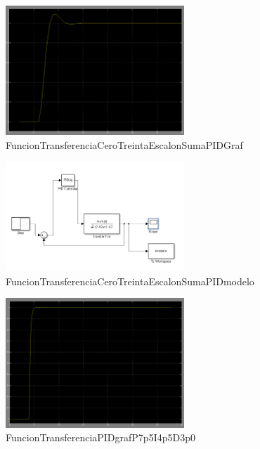 \documentclass[]{article}
\begin{document}
\begin{figure}[h!]
	\centering
	\includegraphics[width=0.6\textwidth]{Imagenes/FuncionTransferenciaCeroTreintaEscalonSumaPIDGraf}
	\caption{FuncionTransferenciaCeroTreintaEscalonSumaPIDGraf}
	\label{fig:FuncionTransferenciaCeroTreintaEscalonSumaPIDGraf}
\end{figure}

\begin{figure}[h!]
	\centering
	\includegraphics[width=0.6\textwidth]{Imagenes/FuncionTransferenciaCeroTreintaEscalonSumaPIDmodelo}
	\caption{FuncionTransferenciaCeroTreintaEscalonSumaPIDmodelo}
	\label{fig:FuncionTransferenciaCeroTreintaEscalonSumaPIDmodelo}
\end{figure}



\begin{figure}[h!]
	\centering
	\includegraphics[width=0.6\textwidth]{Imagenes/FuncionTransferenciaPIDgrafP7p5I4p5D3p0}
	\caption{FuncionTransferenciaPIDgrafP7p5I4p5D3p0}
	\label{fig:FuncionTransferenciaPIDgrafP7p5I4p5D3p0}
\end{figure}
\end{document}
